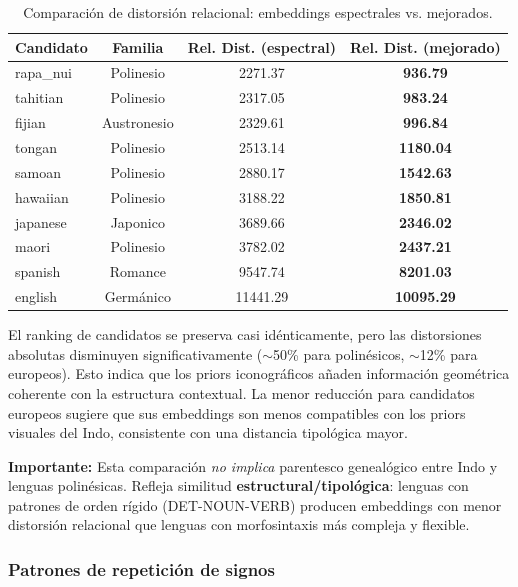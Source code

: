 \documentclass[11pt,a4paper]{article}
\newcommand{\1}{\mathbf{1}}
\numberwithin{equation}{section}
\begin{document}
\begin{table}[h]
\centering
\caption{Comparación de distorsión relacional: embeddings espectrales vs. mejorados.}
\label{tab:enhanced}
\begin{tabular}{lccc}
\toprule
Candidato & Familia & Rel. Dist. (espectral) & Rel. Dist. (mejorado) \\
\midrule
rapa\_nui & Polinesio & 2271.37 & \textbf{936.79} \\
tahitian & Polinesio & 2317.05 & \textbf{983.24} \\
fijian & Austronesio & 2329.61 & \textbf{996.84} \\
tongan & Polinesio & 2513.14 & \textbf{1180.04} \\
samoan & Polinesio & 2880.17 & \textbf{1542.63} \\
hawaiian & Polinesio & 3188.22 & \textbf{1850.81} \\
japanese & Japonico & 3689.66 & \textbf{2346.02} \\
maori & Polinesio & 3782.02 & \textbf{2437.21} \\
spanish & Romance & 9547.74 & \textbf{8201.03} \\
english & Germánico & 11441.29 & \textbf{10095.29} \\
\bottomrule
\end{tabular}
\end{table}

El ranking de candidatos se preserva casi idénticamente, pero las distorsiones absolutas disminuyen significativamente ($\sim$50\% para polinésicos, $\sim$12\% para europeos). Esto indica que los priors iconográficos añaden información geométrica coherente con la estructura contextual. La menor reducción para candidatos europeos sugiere que sus embeddings son menos compatibles con los priors visuales del Indo, consistente con una distancia tipológica mayor.

\textbf{Importante:} Esta comparación \emph{no implica} parentesco genealógico entre Indo y lenguas polinésicas. Refleja similitud \textbf{estructural/tipológica}: lenguas con patrones de orden rígido (DET-NOUN-VERB) producen embeddings con menor distorsión relacional que lenguas con morfosintaxis más compleja y flexible.

\subsubsection{Patrones de repetición de signos}
\end{document}
